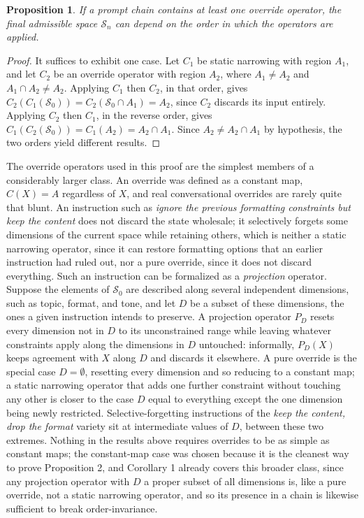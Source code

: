 \documentclass[11pt]{article}
\newtheorem{proposition}{Proposition}
\begin{document}
\begin{proposition}
If a prompt chain contains at least one override operator, the final admissible space $\mathcal{S}_n$ can depend on the order in which the operators are applied.
\end{proposition}

\begin{proof}
It suffices to exhibit one case. Let $C_1$ be static narrowing with region $A_1$, and let $C_2$ be an override operator with region $A_2$, where $A_1 \neq A_2$ and $A_1 \cap A_2 \neq A_2$. Applying $C_1$ then $C_2$, in that order, gives $C_2(C_1(\mathcal{S}_0)) = C_2(\mathcal{S}_0 \cap A_1) = A_2$, since $C_2$ discards its input entirely. Applying $C_2$ then $C_1$, in the reverse order, gives $C_1(C_2(\mathcal{S}_0)) = C_1(A_2) = A_2 \cap A_1$. Since $A_2 \neq A_2 \cap A_1$ by hypothesis, the two orders yield different results.
\end{proof}

The override operators used in this proof are the simplest members of a considerably larger class. An override was defined as a constant map, $C(X) = A$ regardless of $X$, and real conversational overrides are rarely quite that blunt. An instruction such as \emph{ignore the previous formatting constraints but keep the content} does not discard the state wholesale; it selectively forgets some dimensions of the current space while retaining others, which is neither a static narrowing operator, since it can restore formatting options that an earlier instruction had ruled out, nor a pure override, since it does not discard everything. Such an instruction can be formalized as a \emph{projection} operator. Suppose the elements of $\mathcal{S}_0$ are described along several independent dimensions, such as topic, format, and tone, and let $D$ be a subset of these dimensions, the ones a given instruction intends to preserve. A projection operator $P_D$ resets every dimension not in $D$ to its unconstrained range while leaving whatever constraints apply along the dimensions in $D$ untouched: informally, $P_D(X)$ keeps agreement with $X$ along $D$ and discards it elsewhere. A pure override is the special case $D = \emptyset$, resetting every dimension and so reducing to a constant map; a static narrowing operator that adds one further constraint without touching any other is closer to the case $D$ equal to everything except the one dimension being newly restricted. Selective-forgetting instructions of the \emph{keep the content, drop the format} variety sit at intermediate values of $D$, between these two extremes. Nothing in the results above requires overrides to be as simple as constant maps; the constant-map case was chosen because it is the cleanest way to prove Proposition 2, and Corollary 1 already covers this broader class, since any projection operator with $D$ a proper subset of all dimensions is, like a pure override, not a static narrowing operator, and so its presence in a chain is likewise sufficient to break order-invariance.
\end{document}
